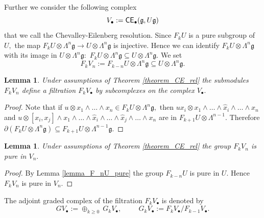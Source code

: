 \documentclass{amsart}
\numberwithin{equation}{section}
\newtheorem{lemma}[theorem]{Lemma}
\theoremstyle{definition}
\def\gg{\mathfrak{g}}
\begin{document}
Further we consider the following complex $$V_\bullet:={\sf CE}_\bullet(\gg, U\gg)$$
that we call the Chevalley-Eilenberg resolution. 
Since $F_kU$ is a pure subgroup of $U,$ the map $F_kU\otimes \Lambda^n \gg\to U \otimes \Lambda^n \gg$ is injective. Hence we can identify $F_kU\otimes \Lambda^n \gg$ with its image in $U\otimes \Lambda^n \gg:$
$F_kU\otimes \Lambda^n \gg \subseteq U\otimes \Lambda^n\gg.
$
We set $$F_kV_n:=F_{k-n}U\otimes \Lambda^n\gg \subseteq U\otimes \Lambda^n \gg.$$

\begin{lemma} Under assumptions of Theorem \ref{theorem_CE_rel} 
the submodules $F_kV_n$ define a filtration $F_kV_\bullet$ by subcomplexes on the complex $V_\bullet.$ 
\end{lemma}
\begin{proof}
Note that if
$u\otimes x_1\wedge \dots \wedge x_n\in F_kU\otimes \Lambda^n\gg,$ then $ux_i\otimes x_1\wedge \dots \wedge \hat x_i \wedge \dots \wedge x_n$ and $u\otimes [x_i,x_j]\wedge x_1\wedge \dots \wedge \hat x_i \wedge \dots \wedge \hat x_j \wedge \dots \wedge x_n $ are in $F_{k+1}U\otimes \Lambda^{n-1}.$ Therefore $\partial( F_kU\otimes \Lambda^n \gg )\subseteq F_{k+1}U \otimes \Lambda^{n-1}\gg.$ 
\end{proof}




\begin{lemma}\label{lemma_F_kV_pure} Under assumptions of Theorem \ref{theorem_CE_rel} the group $F_kV_n$ is pure in $V_n.$
\end{lemma}
\begin{proof}By Lemma \ref{lemma_F_nU_pure} the group $F_{k-n}U$ is pure in $U$. Hence $F_kV_n$ is pure in $V_n.$
\end{proof}




The adjoint graded complex of the filtration $F_kV_\bullet$ is denoted by 
$$GV_\bullet:=\oplus_{k\geq 0}\: G_kV_\bullet,\hspace{1cm} G_kV_\bullet := F_kV_\bullet/F_{k-1}V_\bullet.$$
\end{document}

